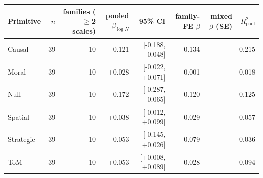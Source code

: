 \begin{tabular}{lrrrrrrr}
\toprule
Primitive & $n$ & families ($\geq$2 scales) & pooled $\beta_{\log N}$ & 95\% CI & family-FE $\beta$ & mixed $\beta$ (SE) & $R^2_{\text{pool}}$ \\
\midrule
Causal & 39 & 10 & -0.121 & [-0.188, -0.048] & -0.134 & -- & 0.215 \\
Moral & 39 & 10 & +0.028 & [-0.022, +0.071] & -0.001 & -- & 0.018 \\
Null & 39 & 10 & -0.172 & [-0.287, -0.065] & -0.120 & -- & 0.125 \\
Spatial & 39 & 10 & +0.038 & [-0.012, +0.099] & +0.029 & -- & 0.057 \\
Strategic & 39 & 10 & -0.053 & [-0.145, +0.026] & -0.079 & -- & 0.036 \\
ToM & 39 & 10 & +0.053 & [+0.008, +0.089] & +0.028 & -- & 0.094 \\
\bottomrule
\end{tabular}
